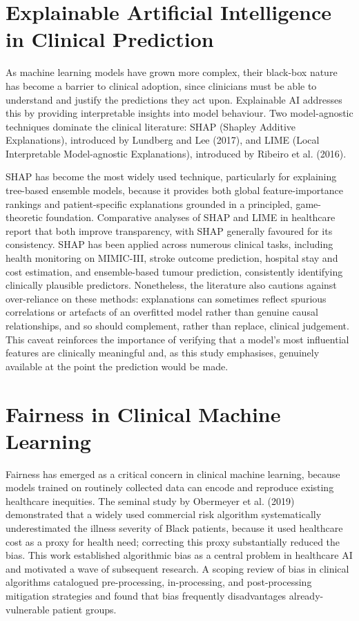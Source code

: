\documentclass[12pt,a4paper]{report}
\begin{document}
\section{Explainable Artificial Intelligence in Clinical Prediction}
As machine learning models have grown more complex, their black-box nature has become a barrier to clinical adoption, since clinicians must be able to understand and justify the predictions they act upon. Explainable AI addresses this by providing interpretable insights into model behaviour. Two model-agnostic techniques dominate the clinical literature: SHAP (Shapley Additive Explanations), introduced by Lundberg and Lee (2017), and LIME (Local Interpretable Model-agnostic Explanations), introduced by Ribeiro et al. (2016).

SHAP has become the most widely used technique, particularly for explaining tree-based ensemble models, because it provides both global feature-importance rankings and patient-specific explanations grounded in a principled, game-theoretic foundation. Comparative analyses of SHAP and LIME in healthcare report that both improve transparency, with SHAP generally favoured for its consistency. SHAP has been applied across numerous clinical tasks, including health monitoring on MIMIC-III, stroke outcome prediction, hospital stay and cost estimation, and ensemble-based tumour prediction, consistently identifying clinically plausible predictors. Nonetheless, the literature also cautions against over-reliance on these methods: explanations can sometimes reflect spurious correlations or artefacts of an overfitted model rather than genuine causal relationships, and so should complement, rather than replace, clinical judgement. This caveat reinforces the importance of verifying that a model's most influential features are clinically meaningful and, as this study emphasises, genuinely available at the point the prediction would be made.


\section{Fairness in Clinical Machine Learning}
Fairness has emerged as a critical concern in clinical machine learning, because models trained on routinely collected data can encode and reproduce existing healthcare inequities. The seminal study by Obermeyer et al. (2019) demonstrated that a widely used commercial risk algorithm systematically underestimated the illness severity of Black patients, because it used healthcare cost as a proxy for health need; correcting this proxy substantially reduced the bias. This work established algorithmic bias as a central problem in healthcare AI and motivated a wave of subsequent research. A scoping review of bias in clinical algorithms catalogued pre-processing, in-processing, and post-processing mitigation strategies and found that bias frequently disadvantages already-vulnerable patient groups.
\end{document}
